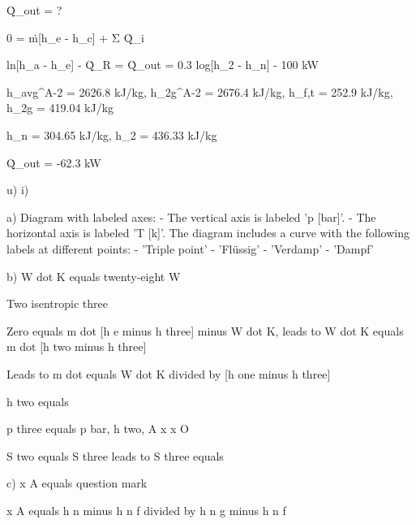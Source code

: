 Q̇_out = ?

0 = ṁ[h_e - h_c] + Σ Q̇_i

ln[h_a - h_e] - Q̇_R = Q̇_out = 0.3 log[h_2 - h_n] - 100 kW

h_avg^A-2 = 2626.8 kJ/kg, h_2g^A-2 = 2676.4 kJ/kg, h_f,t = 252.9 kJ/kg, h_2g = 419.04 kJ/kg

h_n = 304.65 kJ/kg, h_2 = 436.33 kJ/kg

Q̇_out = -62.3 kW

u) i)

a) Diagram with labeled axes: 
- The vertical axis is labeled 'p [bar]'.
- The horizontal axis is labeled 'T [k]'.
The diagram includes a curve with the following labels at different points:
- 'Triple point'
- 'Flüssig'
- 'Verdamp'
- 'Dampf'

b) W dot K equals twenty-eight W

Two isentropic three

Zero equals m dot [h e minus h three] minus W dot K, leads to W dot K equals m dot [h two minus h three]

Leads to m dot equals W dot K divided by [h one minus h three]

h two equals

p three equals p bar, h two, A x x O

S two equals S three leads to S three equals

c) x A equals question mark

x A equals h n minus h n f divided by h n g minus h n f